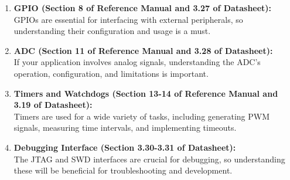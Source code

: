\documentclass{article}
\begin{document}
\begin{enumerate}[label=\textbf{\arabic*.}]
    \item \textbf{GPIO (Section 8 of Reference Manual and 3.27 of Datasheet):} \\
    GPIOs are essential for interfacing with external peripherals, so understanding their configuration and usage is a must.

    \item \textbf{ADC (Section 11 of Reference Manual and 3.28 of Datasheet):} \\
    If your application involves analog signals, understanding the ADC's operation, configuration, and limitations is important.

    \item \textbf{Timers and Watchdogs (Section 13-14 of Reference Manual and 3.19 of Datasheet):} \\
    Timers are used for a wide variety of tasks, including generating PWM signals, measuring time intervals, and implementing timeouts.

    \item \textbf{Debugging Interface (Section 3.30-3.31 of Datasheet):} \\
    The JTAG and SWD interfaces are crucial for debugging, so understanding these will be beneficial for troubleshooting and development.
\end{enumerate}
\end{document}
